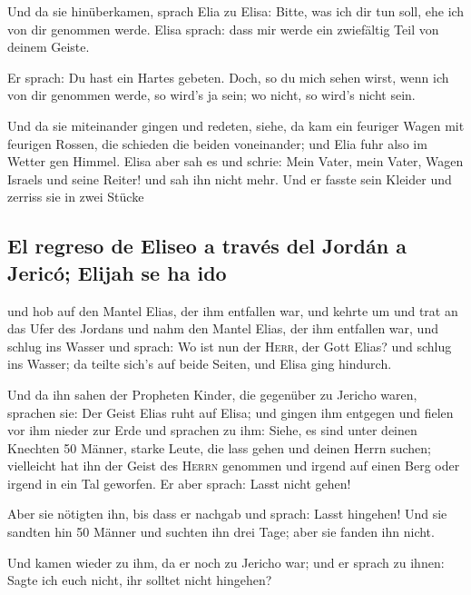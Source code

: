  Und da sie hinüberkamen, sprach Elia zu Elisa: Bitte, was
ich dir tun soll, ehe ich von dir genommen werde. Elisa sprach: dass mir
werde ein zwiefältig Teil von deinem Geiste.

 Er sprach: Du hast ein Hartes gebeten. Doch, so du mich
sehen wirst, wenn ich von dir genommen werde, so wird's ja sein; wo
nicht, so wird's nicht sein.

 Und da sie miteinander gingen und redeten, siehe, da kam
ein feuriger Wagen mit feurigen Rossen, die schieden die beiden
voneinander; und Elia fuhr also im Wetter gen Himmel. 
Elisa aber sah es und schrie: Mein Vater, mein Vater, Wagen Israels und
seine Reiter! und sah ihn nicht mehr. Und er fasste sein Kleider und
zerriss sie in zwei Stücke

\hypertarget{el-regreso-de-eliseo-a-travuxe9s-del-jorduxe1n-a-jericuxf3-elijah-se-ha-ido}{%
\subsection{El regreso de Eliseo a través del Jordán a Jericó; Elijah se
ha
ido}\label{el-regreso-de-eliseo-a-travuxe9s-del-jorduxe1n-a-jericuxf3-elijah-se-ha-ido}}

 und hob auf den Mantel Elias, der ihm entfallen war, und
kehrte um und trat an das Ufer des Jordans  und nahm den
Mantel Elias, der ihm entfallen war, und schlug ins Wasser und sprach:
Wo ist nun der \textsc{Herr}, der Gott Elias? und schlug ins Wasser; da
teilte sich's auf beide Seiten, und Elisa ging hindurch.

 Und da ihn sahen der Propheten Kinder, die gegenüber zu
Jericho waren, sprachen sie: Der Geist Elias ruht auf Elisa; und gingen
ihm entgegen und fielen vor ihm nieder zur Erde  und
sprachen zu ihm: Siehe, es sind unter deinen Knechten 50 Männer, starke
Leute, die lass gehen und deinen Herrn suchen; vielleicht hat ihn der
Geist des \textsc{Herrn} genommen und irgend auf einen Berg oder irgend
in ein Tal geworfen. Er aber sprach: Lasst nicht gehen!

 Aber sie nötigten ihn, bis dass er nachgab und sprach:
Lasst hingehen! Und sie sandten hin 50 Männer und suchten ihn drei Tage;
aber sie fanden ihn nicht.

 Und kamen wieder zu ihm, da er noch zu Jericho war; und
er sprach zu ihnen: Sagte ich euch nicht, ihr solltet nicht hingehen?

